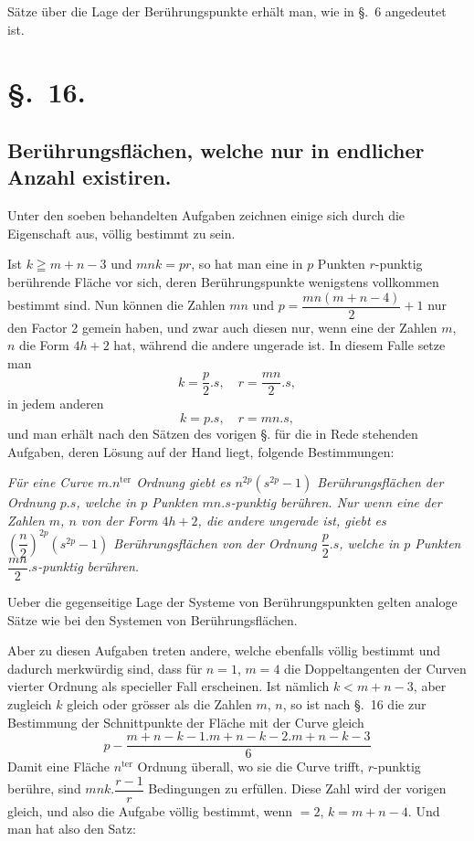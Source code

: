 \documentclass{article}
\begin{document}
Sätze über die Lage der Berührungspunkte erhält man, wie in §.~6 angedeutet ist.

\section*{§.~16.}

\subsection*{Berührungsflächen, welche nur in endlicher Anzahl existiren.}

Unter den soeben behandelten Aufgaben zeichnen einige sich durch die Eigenschaft aus, völlig bestimmt zu sein.

Ist $k\geqq m+n-3$ und $mnk = pr$, so hat man eine in $p$ Punkten $r$-punktig berührende Fläche vor sich, deren Berührungspunkte wenigstens vollkommen bestimmt sind. Nun können die Zahlen $mn$ und $p = \dfrac{mn(m+n-4)}{2}+1$ nur den Factor 2 gemein haben, und zwar auch diesen nur, wenn eine der Zahlen $m$, $n$ die Form $4h+2$ hat, während die andere ungerade ist. In diesem Falle setze man
\[
k = \frac{p}{2}.s, \quad r = \frac{mn}{2}.s,
\]
in jedem anderen
\[
k = p.s, \quad r = mn.s,
\]
und man erhält nach den Sätzen des vorigen §. für die in Rede stehenden Aufgaben, deren Lösung auf der Hand liegt, folgende Bestimmungen:

\emph{Für eine Curve $m.n^{\text{ter}}$ Ordnung giebt es $n^{2p}(s^{2p}-1)$ Berührungsflächen der Ordnung $p.s$, welche in $p$ Punkten $mn.s$-punktig berühren. Nur wenn eine der Zahlen $m$, $n$ von der Form $4h+2$, die andere ungerade ist, giebt es $\left(\dfrac{n}{2}\right)^{2p}(s^{2p}-1)$ Berührungsflächen von der Ordnung $\dfrac{p}{2}.s$, welche in $p$ Punkten $\dfrac{mn}{2}.s$-punktig berühren.}


Ueber die gegenseitige Lage der Systeme von Berührungspunkten gelten analoge Sätze wie bei den Systemen von Berührungsflächen.

Aber zu diesen Aufgaben treten andere, welche ebenfalls völlig bestimmt und dadurch merkwürdig sind, dass für $n=1$, $m=4$ die Doppeltangenten der Curven vierter Ordnung als specieller Fall erscheinen. Ist nämlich $k<m+n-3$, aber zugleich $k$ gleich oder grösser als die Zahlen $m$, $n$, so ist nach §.~16 die zur Bestimmung der Schnittpunkte der Fläche mit der Curve gleich
\[
p-\frac{m+n-k-1.m+n-k-2.m+n-k-3}{6}
\]
Damit eine Fläche $n^{\text{ter}}$ Ordnung überall, wo sie die Curve trifft, $r$-punktig berühre, sind $mnk.\dfrac{r-1}{r}$ Bedingungen zu erfüllen. Diese Zahl wird der vorigen gleich, und also die Aufgabe völlig bestimmt, wenn  $= 2$, $k = m+n-4$. Und man hat also den Satz:
\end{document}
